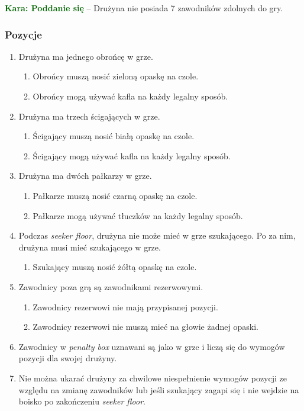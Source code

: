 \documentclass[11pt,a4paper]{article}
\newcommand\penaltyd[2]{\bgroup\textcolor{darkgreen}{\textbf{Kara: #1}} -- #2}
\begin{document}
\penaltyd{Poddanie się}{Drużyna nie posiada 7 zawodników zdolnych do gry.}

\subsubsection{Pozycje}
\begin{enumerate}
  \item Drużyna ma jednego obrońcę w grze.
  \begin{enumerate}
    \item Obrońcy muszą nosić zieloną opaskę na czole.
    \item Obrońcy mogą używać kafla na każdy legalny sposób.
  \end{enumerate}

  \item Drużyna ma trzech ścigających w grze.
  \begin{enumerate}
    \item Ścigający muszą nosić białą opaskę na czole.
    \item Ścigający mogą używać kafla na każdy legalny sposób.
  \end{enumerate}

  \item Drużyna ma dwóch pałkarzy w grze.
  \begin{enumerate}
    \item Pałkarze muszą nosić czarną opaskę na czole.
    \item Pałkarze mogą używać tłuczków na każdy legalny sposób.
  \end{enumerate}

  \item Podczas \emph{seeker floor}, drużyna nie może mieć w grze szukającego. Po za nim, drużyna musi mieć szukającego w grze.
  \begin{enumerate}
    \item Szukający muszą nosić żółtą opaskę na czole.
  \end{enumerate}

  \item Zawodnicy poza grą są zawodnikami rezerwowymi.
  \begin{enumerate}
    \item Zawodnicy rezerwowi nie mają przypisanej pozycji.
    \item Zawodnicy rezerwowi nie muszą mieć na głowie żadnej opaski.
  \end{enumerate}

  \item Zawodnicy w \emph{penalty box} uznawani są jako w grze i liczą się do wymogów pozycji dla swojej drużyny.

  \item Nie można ukarać drużyny za chwilowe niespełnienie wymogów pozycji ze względu na zmianę zawodników lub jeśli szukający zagapi się i nie wejdzie na boisko po zakończeniu \emph{seeker floor}.

\end{enumerate}
\end{document}
